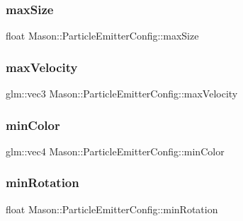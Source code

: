 \subsubsection{\texorpdfstring{max\+Size}{maxSize}}
{\footnotesize\ttfamily float Mason\+::\+Particle\+Emitter\+Config\+::max\+Size}

\hypertarget{struct_mason_1_1_particle_emitter_config_aa449573ac5e8ae2ef3f5110836a3091c}{}\label{struct_mason_1_1_particle_emitter_config_aa449573ac5e8ae2ef3f5110836a3091c} 
\subsubsection{\texorpdfstring{max\+Velocity}{maxVelocity}}
{\footnotesize\ttfamily glm\+::vec3 Mason\+::\+Particle\+Emitter\+Config\+::max\+Velocity}

\hypertarget{struct_mason_1_1_particle_emitter_config_aa70f6e44cc9712bf59ef89e1a339726d}{}\label{struct_mason_1_1_particle_emitter_config_aa70f6e44cc9712bf59ef89e1a339726d} 
\subsubsection{\texorpdfstring{min\+Color}{minColor}}
{\footnotesize\ttfamily glm\+::vec4 Mason\+::\+Particle\+Emitter\+Config\+::min\+Color}

\hypertarget{struct_mason_1_1_particle_emitter_config_ae6755b96da7af8b4c469b64f0887e186}{}\label{struct_mason_1_1_particle_emitter_config_ae6755b96da7af8b4c469b64f0887e186} 
\subsubsection{\texorpdfstring{min\+Rotation}{minRotation}}
{\footnotesize\ttfamily float Mason\+::\+Particle\+Emitter\+Config\+::min\+Rotation}

\hypertarget{struct_mason_1_1_particle_emitter_config_ab46ccc780e60c6b7006749058654455f}{}\label{struct_mason_1_1_particle_emitter_config_ab46ccc780e60c6b7006749058654455f} 
